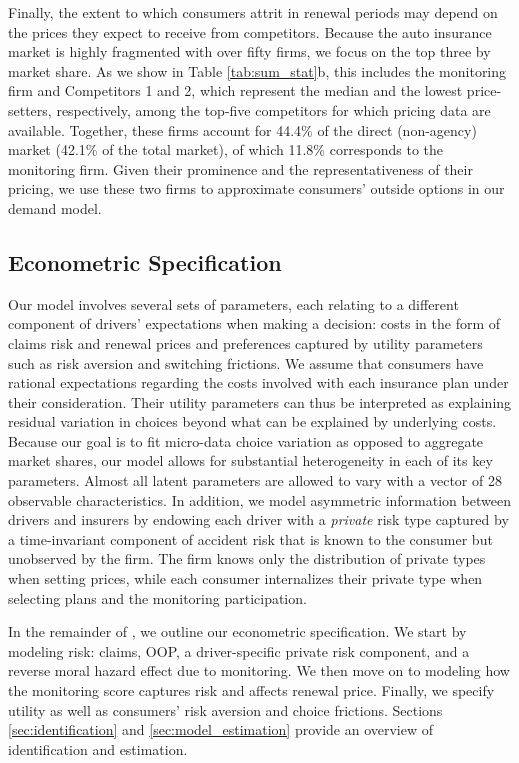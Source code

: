 Finally, the extent to which consumers attrit in renewal periods may depend on the prices they expect to receive from competitors.
Because the auto insurance market is highly fragmented with over fifty firms, we focus on the top three by market share. As we show in Table \ref{tab:sum_stat}b, this includes the monitoring firm and Competitors 1 and 2, which represent the median and the lowest price-setters, respectively, among the top-five competitors for which pricing data are available. Together, these firms account for 44.4\% of the direct (non-agency) market (42.1\% of the total market), of which 11.8\% corresponds to the monitoring firm.
Given their prominence and the representativeness of their pricing, we use these two firms to approximate consumers' outside options in our demand model.

\subsection{Econometric Specification} \label{sec:econometric-model}
Our model involves several sets of parameters, each relating to a different component of drivers' expectations when making a decision: costs in the form of claims risk and renewal prices and preferences captured by utility parameters such as risk aversion and switching frictions.
We assume that consumers have rational expectations regarding the costs involved with each insurance plan under their consideration. Their utility parameters can thus be interpreted as explaining residual variation in choices beyond what can be explained by underlying costs. Because our goal is to fit micro-data choice variation as opposed to aggregate market shares, our model allows for substantial heterogeneity in each of its key parameters. Almost all latent parameters are allowed to vary with a vector of 28 observable characteristics. In addition, we model asymmetric information between drivers and insurers by endowing each driver with a \textit{private} risk type captured by a time-invariant component of accident risk that is known to the consumer but unobserved by the firm. The firm knows only the distribution of private types when setting prices, while each consumer internalizes their private type when selecting plans and the monitoring participation.

In the remainder of , we outline our econometric specification. We start by modeling risk: claims, OOP, a driver-specific private risk component, and a reverse moral hazard effect due to monitoring. We then move on to modeling how the monitoring score captures risk and affects renewal price. Finally, we specify utility as well as consumers' risk aversion and choice frictions. Sections \ref{sec:identification} and \ref{sec:model_estimation} provide an overview of identification and estimation.


